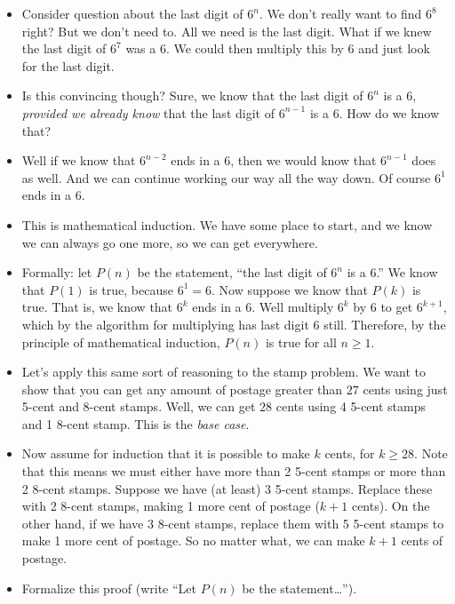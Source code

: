 \documentclass[12pt]{article}
\theoremstyle{plain}
\theoremstyle{definition}
\theoremstyle{remark}
\begin{document}
\begin{itemize}
\item Consider question about the last digit of $6^n$.   We don't really want to find $6^8$ right?  But we don't need to.  All we need is the last digit.  What if we knew the last digit of $6^7$ was a 6.  We could then multiply this by $6$ and just look for the last digit.
\item Is this convincing though?  Sure, we know that the last digit of $6^n$ is a 6, {\em provided we already know} that the last digit of $6^{n-1}$ is a 6.  How do we know that?
\item Well if we know that $6^{n-2}$ ends in a 6, then we would know that $6^{n-1}$ does as well.  And we can continue working our way all the way down.  Of course $6^1$ ends in a 6.
\item This is mathematical induction.  We have some place to start, and we know we can always go one more, so we can get everywhere.
\item Formally: let $P(n)$ be the statement, ``the last digit of $6^n$ is a 6.''  We know that $P(1)$ is true, because $6^1 = 6$.  Now suppose we know that $P(k)$ is true.  That is, we know that $6^k$ ends in a 6.  Well multiply $6^k$ by 6 to get $6^{k+1}$, which by the algorithm for multiplying has last digit 6 still.  Therefore, by the principle of mathematical induction, $P(n)$ is true for all $n \ge 1$.

  \item Let's apply this same sort of reasoning to the stamp problem.  We want to show that you can get any amount of postage greater than $27$ cents using just 5-cent and 8-cent stamps.  Well, we can get $28$ cents using 4 5-cent stamps and 1 8-cent stamp.  This is the {\em base case}.

  \item Now assume for induction that it is possible to make $k$ cents, for $k \ge 28$.  Note that this means we must either have more than 2 5-cent stamps or more than 2 8-cent stamps.  Suppose we have (at least) 3 5-cent stamps.  Replace these with 2 8-cent stamps, making 1 more cent of postage ($k+1$ cents).  On the other hand, if we have 3 8-cent stamps, replace them with 5 5-cent stamps to make 1 more cent of postage.  So no matter what, we can make $k+1$ cents of postage.

  \item Formalize this proof (write ``Let $P(n)$ be the statement\ldots'').
\end{itemize}
\end{document}
